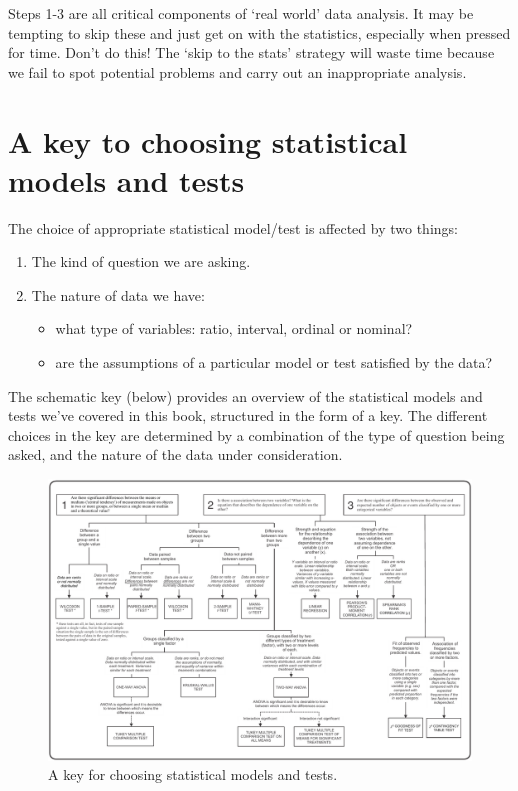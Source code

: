 \documentclass[
]{book}
\providecommand{\tightlist}{%
  \setlength{\itemsep}{0pt}\setlength{\parskip}{0pt}}
\begin{document}
Steps 1-3 are all critical components of `real world' data analysis. It may be tempting to skip these and just get on with the statistics, especially when pressed for time. Don't do this! The `skip to the stats' strategy will waste time because we fail to spot potential problems and carry out an inappropriate analysis.

\hypertarget{a-key-to-choosing-statistical-models-and-tests}{%
\section{A key to choosing statistical models and tests}\label{a-key-to-choosing-statistical-models-and-tests}}

The choice of appropriate statistical model/test is affected by two things:

\begin{enumerate}
\def\labelenumi{\arabic{enumi}.}
\item
  The kind of question we are asking.
\item
  The nature of data we have:

  \begin{itemize}
  \tightlist
  \item
    what type of variables: ratio, interval, ordinal or nominal?
  \item
    are the assumptions of a particular model or test satisfied by the data?
  \end{itemize}
\end{enumerate}

The schematic key (below) provides an overview of the statistical models and tests we've covered in this book, structured in the form of a key. The different choices in the key are determined by a combination of the type of question being asked, and the nature of the data under consideration.

\begin{figure}

{\centering \includegraphics[width=1\linewidth]{./images/stats_key} 

}

\caption{A key for choosing statistical models and tests.}\label{fig:stats-key}
\end{figure}
\end{document}
